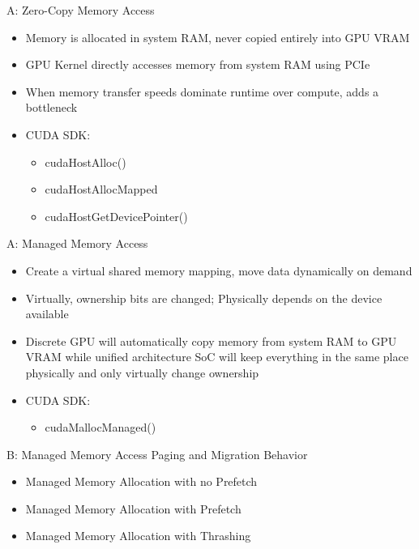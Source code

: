\documentclass{beamer}
\begin{document}
\begin{frame}{A: Zero-Copy Memory Access}
\begin{itemize}
    \item Memory is allocated in system RAM, never copied entirely into GPU VRAM
    \item GPU Kernel directly accesses memory from system RAM using PCIe
    \item When memory transfer speeds dominate runtime over compute, adds a bottleneck
    \item CUDA SDK:
        \begin{itemize}
            \item cudaHostAlloc()
            \item cudaHostAllocMapped
            \item cudaHostGetDevicePointer()
        \end{itemize}
\end{itemize}
\end{frame}

\begin{frame}{A: Managed Memory Access}
\begin{itemize}
    \item Create a virtual shared memory mapping, move data dynamically on demand
    \item Virtually, ownership bits are changed; Physically depends on the device available 
    \item Discrete GPU will automatically copy memory from system RAM to GPU VRAM while unified architecture SoC will keep everything in the same place physically and only virtually change ownership
     \item CUDA SDK:
        \begin{itemize}
            \item cudaMallocManaged()
        \end{itemize}
\end{itemize}
\end{frame}
\begin{frame}{B: Managed Memory Access Paging and Migration Behavior}
\begin{itemize}
    \item Managed Memory Allocation with no Prefetch
    \item Managed Memory Allocation with Prefetch
    \item Managed Memory Allocation with Thrashing
\end{itemize}
\end{frame}
\end{document}
